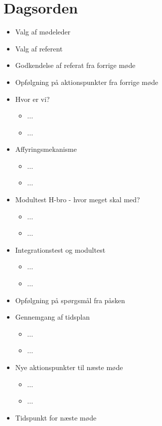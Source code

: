 \documentclass{article}
\begin{document}
	\section{Dagsorden}
	\begin{itemize}
		\item Valg af mødeleder
		\item Valg af referent
		\item Godkendelse af referat fra forrige møde 
		\item Opfølgning på aktionspunkter fra forrige møde
		\item Hvor er vi? 
		\begin{itemize}
			\item ...
			\item ...
		\end{itemize}
		\item Affyringsmekanisme
		\begin{itemize}
			\item ...
			\item ...
		\end{itemize}
		\item Modultest H-bro - hvor meget skal med? 
		\begin{itemize}
			\item ...
			\item ...
		\end{itemize}
		\item Integrationstest og modultest
		\begin{itemize}
			\item ...
			\item ...
		\end{itemize}
		\item Opfølgning på spørgsmål fra påsken
		\item Gennemgang af tidsplan
		\begin{itemize}
			\item ...
			\item ...
		\end{itemize}
		\item Nye aktionspunkter til næste møde
		\begin{itemize}
			\item ...
			\item ...
		\end{itemize}
		\item Tidspunkt for næste møde
	\end{itemize}
\end{document}
